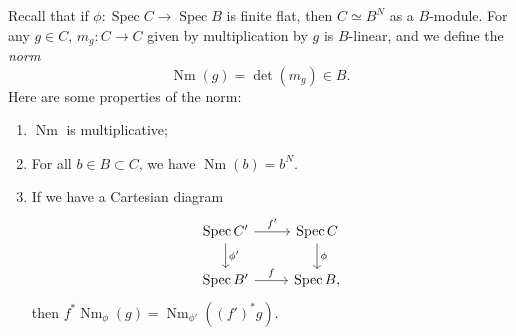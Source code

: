 \documentclass{amsart}
\theoremstyle{definition}
\theoremstyle{remark}
\theoremstyle{plain}
\theoremstyle{definition}
\theoremstyle{remark}
\newcommand{\on}[1]{\operatorname{#1}}
\newcommand{\1}{\mathbf{1}}
\newcommand{\2}{\mathbf{2}}
\newcommand{\3}{\mathbf{3}}
\DeclareMathOperator{\Spec}{Spec}
\begin{document}
Recall that if \(\phi \colon \Spec C \to \Spec B\) is finite flat, then \(C \simeq B^N\) as a \(B\)-module. For any \(g \in C\), \(m_g \colon C \to C\) given by multiplication by \(g\) is \(B\)-linear, and we define the \textit{norm} 
\[\on{Nm}(g) = \det (m_g) \in B.\]
Here are some properties of the norm:
\begin{enumerate}
    \item \(\on{Nm}\) is multiplicative;
    \item For all \(b \in B \subset C\), we have \(\on{Nm}(b) = b^N\).
    \item If we have a Cartesian diagram
    \begin{equation*}
    \begin{tikzcd}
        \Spec C' \ar{r}{f'} \ar{d}{\phi'} & \Spec C \ar{d}{\phi} \\
        \Spec B' \ar{r}{f} & \Spec B,
    \end{tikzcd}
    \end{equation*}
    then \(f^* \on{Nm}_{\phi}(g) = \on{Nm}_{\phi'} ((f')^* g)\).
\end{enumerate}
\end{document}
